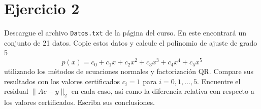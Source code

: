 
\section*{Ejercicio 2}
Descargue el archivo \texttt{Datos.txt} de la página del curso. En este encontrará un conjunto de 21 datos. Copie estos datos y calcule el polinomio de ajuste de grado 5
\[
p(x) = c_0 + c_1x + c_2x^2 + c_3x^3 + c_4x^4 + c_5x^5
\]
utilizando los métodos de ecuaciones normales y factorización QR. Compare sus resultados con los valores certificados $c_i = 1$ para $i = 0, 1, \dots, 5$. Encuentre el residual $\|Ac - y\|_2$ en cada caso, así como la diferencia relativa con respecto a los valores certificados. Escriba sus conclusiones.
